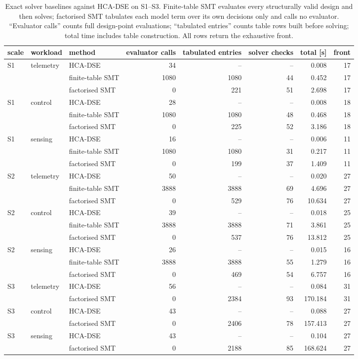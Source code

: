 \documentclass[pdflatex,sn-nature]{sn-jnl}
\theoremstyle{thmstyleone}
\theoremstyle{thmstyletwo}
\theoremstyle{thmstylethree}
\begin{document}
\begin{table}[!htbp]\centering
\caption{Exact solver baselines against HCA-DSE on S1--S3. Finite-table SMT evaluates
every structurally valid design and then solves; factorised SMT tabulates each model term
over its own decisions only and calls no evaluator. ``Evaluator calls'' counts full
design-point evaluations; ``tabulated entries'' counts table rows built before solving;
total time includes table construction. All rows return the exhaustive front.}\label{tabS5}
{\let\scriptsize\tiny\setlength{\tabcolsep}{2pt}\scriptsize
\begin{tabular}{lllrrrrr}
\toprule
scale & workload & method & evaluator calls & tabulated entries & solver checks & total [s] & front \\
\midrule
S1 & telemetry & HCA-DSE & 34 & -- & -- & 0.008 & 17 \\
 &  & finite-table SMT & 1080 & 1080 & 44 & 0.452 & 17 \\
 &  & factorised SMT & 0 & 221 & 51 & 2.698 & 17 \\
S1 & control & HCA-DSE & 28 & -- & -- & 0.008 & 18 \\
 &  & finite-table SMT & 1080 & 1080 & 48 & 0.468 & 18 \\
 &  & factorised SMT & 0 & 225 & 52 & 3.186 & 18 \\
S1 & sensing & HCA-DSE & 16 & -- & -- & 0.006 & 11 \\
 &  & finite-table SMT & 1080 & 1080 & 31 & 0.217 & 11 \\
 &  & factorised SMT & 0 & 199 & 37 & 1.409 & 11 \\
S2 & telemetry & HCA-DSE & 50 & -- & -- & 0.020 & 27 \\
 &  & finite-table SMT & 3888 & 3888 & 69 & 4.696 & 27 \\
 &  & factorised SMT & 0 & 529 & 76 & 10.634 & 27 \\
S2 & control & HCA-DSE & 39 & -- & -- & 0.018 & 25 \\
 &  & finite-table SMT & 3888 & 3888 & 71 & 3.861 & 25 \\
 &  & factorised SMT & 0 & 537 & 76 & 13.812 & 25 \\
S2 & sensing & HCA-DSE & 26 & -- & -- & 0.015 & 16 \\
 &  & finite-table SMT & 3888 & 3888 & 55 & 1.279 & 16 \\
 &  & factorised SMT & 0 & 469 & 54 & 6.757 & 16 \\
S3 & telemetry & HCA-DSE & 56 & -- & -- & 0.084 & 31 \\
 &  & factorised SMT & 0 & 2384 & 93 & 170.184 & 31 \\
S3 & control & HCA-DSE & 43 & -- & -- & 0.088 & 27 \\
 &  & factorised SMT & 0 & 2406 & 78 & 157.413 & 27 \\
S3 & sensing & HCA-DSE & 43 & -- & -- & 0.104 & 27 \\
 &  & factorised SMT & 0 & 2188 & 85 & 168.624 & 27 \\
\bottomrule
\end{tabular}}
\end{table}
\end{document}
